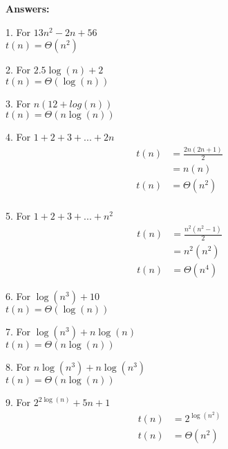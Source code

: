 \documentclass[11pt]{article}
\begin{document}
\textbf{Answers:}
\begin{description}
    \item{1.} For $13n^2 - 2n + 56$ \\
        $t(n)=\Theta(n^2)$

    \item{2.} For $2.5\log(n) + 2$ \\
            $t(n)=\Theta(\log(n))$
    
    \item{3.} For $n(12+log(n))$ \\
            $t(n)=\Theta(n\log(n))$
    
    \item{4.} For $1 + 2 + 3 + ... + 2n$ \\ 
            \[
            \begin{aligned}
            t(n) &= \frac{2n(2n+1)}{2}\\
                &= n(n)\\
            t(n) &= \Theta(n^2)\\
            \end{aligned}
            \]
    
    \item{5.} For $1 + 2 + 3 + ... + n^2$
            \[
                \begin{aligned}
                    t(n) &= \frac{n^2(n^2-1)}{2}\\
                         &= n^2(n^2)\\
                    t(n) &= \Theta(n^4)
                \end{aligned}
            \]
            
    \item{6.} For $\log(n^3) + 10$\\
            $t(n)=\Theta(\log(n))$
    
    \item{7.} For $\log(n^3) + n\log(n)$\\
            $t(n)=\Theta(n\log(n))$
    
    \item{8.} For $n\log(n^3) + n\log(n^3)$\\
            $t(n)=\Theta(n\log(n))$
    
    \item{9.} For $2^{2\log(n)} + 5n + 1$\\
            \[
                \begin{aligned}
                    t(n) &=2^{\log(n^2)}\\
                       t(n) &= \Theta(n^2)
                \end{aligned}
            \]
\end{description}
\end{document}
